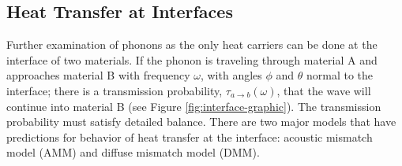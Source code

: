\subsection{Heat Transfer at Interfaces}
Further examination of phonons as the only heat carriers can be done at the interface of two materials. If the phonon is traveling through material A and approaches material B with frequency $\omega$, with angles $\phi$ and $\theta$ normal to the interface; there is a transmission probability, $\tau_{a\rightarrow b}(\omega)$, that the wave will continue into material B (see Figure \ref{fig:interface-graphic}).\cite{Monachon2016} 
The transmission probability must satisfy detailed balance.
There are two major models that have predictions for behavior of heat transfer at the interface: acoustic mismatch model (AMM) and diffuse mismatch model (DMM).\cite{Monachon2016}
